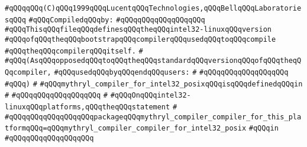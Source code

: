 \label{src/lib/core/mythryl-compiler-compiler/mythryl-compiler-compiler-for-intel32-posix.pkg}
\verb|#qQQqqQQq(C)qQQq1999qQQqLucentqQQqTechnologies,qQQqBellqQQqLaboratoriesqQQq|\newline
\newline
\verb|#qQQqCompiledqQQqby:|\newline
\verb|#qQQqqQQqqQQqqQQqqQQq|\newline
\newline
\verb|#qQQqThisqQQqfileqQQqdefinesqQQqtheqQQqintel32-linuxqQQqversion|\newline
\verb|#qQQqofqQQqtheqQQqbootstrapqQQqcompilerqQQqusedqQQqtoqQQqcompile|\newline
\verb|#qQQqtheqQQqcompilerqQQqitself.|\newline
\verb|#|\newline
\verb|#qQQq(AsqQQqopposedqQQqtoqQQqtheqQQqstandardqQQqversionqQQqofqQQqtheqQQqcompiler,|\newline
\verb|#qQQqusedqQQqbyqQQqendqQQqusers:|\newline
\verb|#|\newline
\verb|#qQQqqQQqqQQqqQQqqQQq|\newline
\verb|#qQQq)|\newline
\verb|#|\newline
\verb|#qQQqmythryl_compiler_for_intel32_posixqQQqisqQQqdefinedqQQqin|\newline
\verb|#|\newline
\verb|#qQQqqQQqqQQqqQQqqQQq|\newline
\verb|#|\newline
\verb|#qQQqOnqQQqintel32-linuxqQQqplatforms,qQQqtheqQQqstatement|\newline
\verb|#|\newline
\verb|#qQQqqQQqqQQqqQQqqQQqpackageqQQqmythryl_compiler_compiler_for_this_platformqQQq=qQQqmythryl_compiler_compiler_for_intel32_posix|\newline
\verb|#qQQqin|\newline
\verb|#qQQqqQQqqQQqqQQqqQQq|\newline
